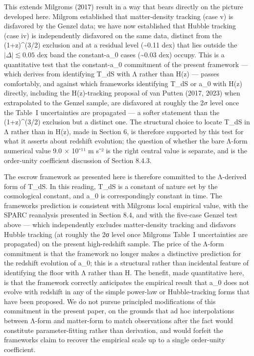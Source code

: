 \documentclass[11pt]{article}
\begin{document}
This extends Milgrom\textquotesingle s (2017) result in a way that bears directly on the picture developed here. Milgrom established that matter-density tracking (case v) is disfavored by the Genzel data; we have now established that Hubble tracking (case iv) is independently disfavored on the same data, distinct from the (1+z)\^{}(3/2) exclusion and at a residual level (\textasciitilde0.11 dex) that lies outside the $|\Delta| \lesssim 0.05$ dex band the constant-a\_0 cases (\textasciitilde0.03 dex) occupy. This is a quantitative test that the constant-a\_0 commitment of the present framework --- which derives from identifying T\_dS with Λ rather than H(z) --- passes comfortably, and against which frameworks identifying T\_dS or a\_0 with H(z) directly, including the H(z)-tracking proposal of van Putten (2017, 2023) when extrapolated to the Genzel sample, are disfavored at roughly the 2$\sigma$ level once the Table~I uncertainties are propagated --- a softer statement than the (1+z)\^{}(3/2) exclusion but a distinct one. The structural choice to locate T\_dS in Λ rather than in H(z), made in Section 6, is therefore supported by this test for what it asserts about redshift evolution; the question of whether the bare Λ-form numerical value 9.0 × 10⁻¹¹ m s⁻² is the right central value is separate, and is the order-unity coefficient discussion of Section 8.4.3.

The escrow framework as presented here is therefore committed to the Λ-derived form of T\_dS. In this reading, T\_dS is a constant of nature set by the cosmological constant, and a\_0 is correspondingly constant in time. The framework\textquotesingle s prediction is consistent with Milgrom\textquotesingle s local empirical value, with the SPARC reanalysis presented in Section 8.4, and with the five-case Genzel test above --- which independently excludes matter-density tracking and disfavors Hubble tracking (at roughly the 2σ level once Milgrom\textquotesingle s Table~I uncertainties are propagated) on the present high-redshift sample. The price of the Λ-form commitment is that the framework no longer makes a distinctive prediction for the redshift evolution of a\_0; this is a structural rather than incidental feature of identifying the floor with Λ rather than H. The benefit, made quantitative here, is that the framework correctly anticipates the empirical result that a\_0 does not evolve with redshift in any of the simple power-law or Hubble-tracking forms that have been proposed. We do not pursue principled modifications of this commitment in the present paper, on the grounds that ad hoc interpolations between Λ-form and matter-form to match observations after the fact would constitute parameter-fitting rather than derivation, and would forfeit the framework\textquotesingle s claim to recover the empirical scale up to a single order-unity coefficient.
\end{document}
